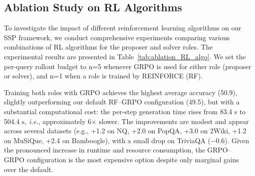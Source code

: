 \documentclass[10pt, a4paper, logo]{googledeepmind} %
\begin{document}

\subsection{Ablation Study on RL Algorithms}
To investigate the impact of different reinforcement learning algorithms on our SSP framework, we conduct comprehensive experiments comparing various combinations of RL algorithms for the proposer and solver roles. The experimental results are presented in Table~\ref{tab:ablation_RL_algo}. We set the per-query rollout budget to n=5 whenever GRPO is used for either role (proposer or solver), and n=1 when a role is trained by REINFORCE (RF).

Training both roles with GRPO achieves the highest average accuracy (50.9), slightly outperforming our default RF--GRPO configuration (49.5), but with a substantial computational cost: the per-step generation time rises from 83.4 s to 504.4 s, \textit{i.e.}, approximately 6$\times$ slower. The improvements are modest and appear across several datasets (e.g., +1.2 on NQ, +2.0 on PopQA, +3.0 on 2Wiki, +1.2 on MuSiQue, +2.4 on Bamboogle), with a small drop on TriviaQA ($-0.6$). Given the pronounced increase in runtime and resource consumption, the GRPO--GRPO configuration is the most expensive option despite only marginal gains over the default.
\end{document}
